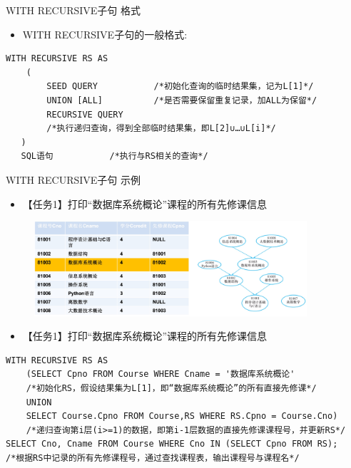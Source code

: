 \begin{frame}{WITH RECURSIVE子句 格式}
\begin{itemize}
\item WITH RECURSIVE子句的一般格式:
\end{itemize}

\begin{block}{}
\begin{lstlisting}
WITH RECURSIVE RS AS
    (
        SEED QUERY           /*初始化查询的临时结果集，记为L[1]*/
        UNION [ALL]          /*是否需要保留重复记录，加ALL为保留*/
        RECURSIVE QUERY      
        /*执行递归查询，得到全部临时结果集，即L[2]∪…∪L[i]*/
   ) 
   SQL语句           /*执行与RS相关的查询*/
\end{lstlisting}
\end{block} 

\end{frame}

\begin{frame}{WITH RECURSIVE子句 示例}
\begin{itemize}
    \item 【任务1】打印“数据库系统概论”课程的所有先修课信息
\end{itemize}
    \begin{figure}
    \centering
    \includegraphics[width=0.9\textwidth]{figure/fig-8.jpg}
\end{figure}

\framebreak
\begin{itemize}
    \item 【任务1】打印“数据库系统概论”课程的所有先修课信息
\end{itemize}

\begin{block}{}
\begin{lstlisting}
WITH RECURSIVE RS AS     
    (SELECT Cpno FROM Course WHERE Cname = '数据库系统概论'
    /*初始化RS，假设结果集为L[1]，即“数据库系统概论”的所有直接先修课*/
    UNION  
    SELECT Course.Cpno FROM Course,RS WHERE RS.Cpno = Course.Cno)
    /*递归查询第i层(i>=1)的数据，即第i-1层数据的直接先修课课程号，并更新RS*/
SELECT Cno, Cname FROM Course WHERE Cno IN (SELECT Cpno FROM RS);
/*根据RS中记录的所有先修课程号，通过查找课程表，输出课程号与课程名*/

\end{lstlisting}
\end{block} 
\end{frame}


